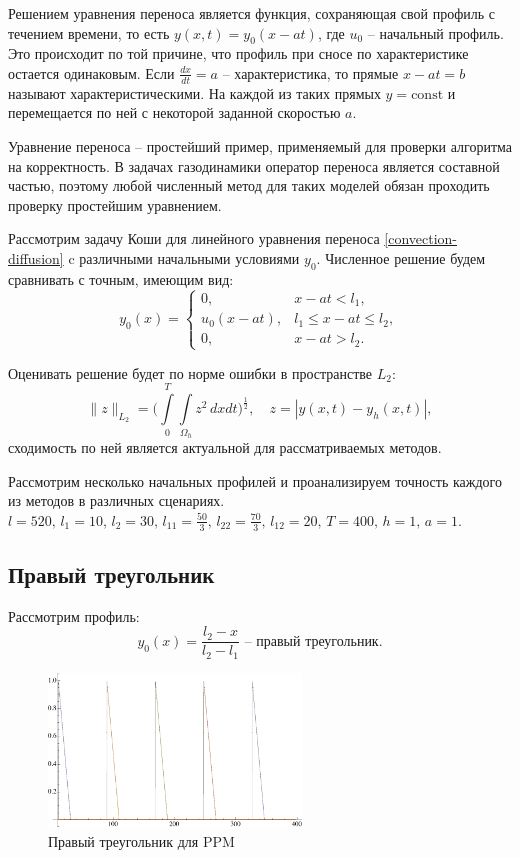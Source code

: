 \documentclass[12pt,a4paper]{article}
\begin{document}
    Решением уравнения переноса является функция, сохраняющая свой профиль с течением времени, то есть $ y(x, t) = y_0(x-at) $, где $ u_0 $ -- начальный профиль. Это происходит по той причине, что профиль при сносе по характеристике остается одинаковым. Если $\frac{dx}{dt} = a $ -- характеристика, то прямые $ x-at = b $ называют характеристическими. На каждой из таких прямых $ y = \text{const} $ и перемещается по ней с некоторой заданной скоростью $ a $. 

    Уравнение переноса – простейший пример, применяемый для проверки алгоритма на корректность. В задачах газодинамики оператор переноса является составной частью, поэтому любой численный метод для таких моделей обязан проходить проверку простейшим уравнением.

    Рассмотрим задачу Коши для линейного уравнения переноса \eqref{convection-diffusion} c различными начальными условиями $ y_0.$ Численное решение будем сравнивать с точным, имеющим вид: 
    \[  y_0(x) = 
         \begin{cases}
            0, & x - at < l_1, \\
            u_0(x-at), & l_1 \leq x-at \leq l_2, \\
            0, & x-at > l_2.
         \end{cases} 
    \]

    Оценивать решение будет по норме ошибки в пространстве $ L_2\colon $
    \[
        \|z\|_{L_2} = \Biggl( \int\limits_{0}^{T}\int\limits_{\Omega_h} z^2\, dx dt \Biggr)^{\tfrac{1}{2}}, \quad z = |y(x,t)-y_h(x,t)|,
    \]
    \noindent сходимость по ней является актуальной для рассматриваемых методов.

    Рассмотрим несколько начальных профилей и проанализируем точность каждого из методов в различных сценариях. $ l = 520,\, l_1 = 10,\, l_2 = 30,\, l_{11} = \frac{50}{3},\, l_{22} = \frac{70}{3},\, l_{12} = 20,\, T = 400,\, h = 1,\, a = 1$.

    \subsection{Правый треугольник}
    Рассмотрим профиль:
    \[
        y_0(x) = \dfrac{l_2 - x}{l_2 - l_1} \text{ -- правый треугольник}.
    \]
    
    \begin{figure}[h]
        \centering
        \includegraphics[width=0.6\textwidth]{c=1/h=1./advectionPPM_rightTriangle.pdf}
        \caption{Правый треугольник для PPM}
        \label{fig:ppm_rightTriangle}
    \end{figure}
\end{document}
